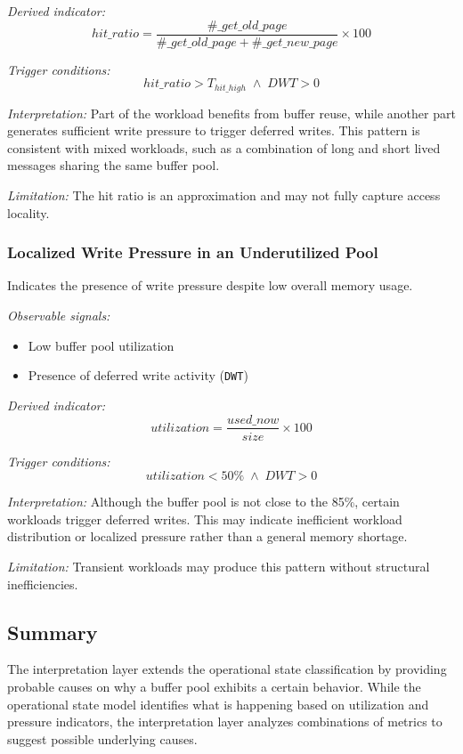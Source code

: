 \textit{Derived indicator:}
\[
hit\_ratio = \frac{\#\_get\_old\_page}{\#\_get\_old\_page + \#\_get\_new\_page} \times 100
\]

\textit{Trigger conditions:}
\[
hit\_ratio > T_{hit\_high} \;\land\; DWT > 0
\]

\textit{Interpretation:}  
Part of the workload benefits from buffer reuse, while another part generates sufficient write pressure to trigger deferred writes. This pattern is consistent with mixed workloads, such as a combination of long and short lived messages sharing the same buffer pool.

\textit{Limitation:}  
The hit ratio is an approximation and may not fully capture access locality.


\subsubsection{Localized Write Pressure in an Underutilized Pool}

Indicates the presence of write pressure despite low overall memory usage.

\textit{Observable signals:}
\begin{itemize}
    \item Low buffer pool utilization
    \item Presence of deferred write activity (\texttt{DWT})
\end{itemize}

\textit{Derived indicator:}
\[
utilization = \frac{used\_now}{size} \times 100
\]

\textit{Trigger conditions:}
\[
utilization < 50\% \;\land\; DWT > 0
\]

\textit{Interpretation:}  
Although the buffer pool is not close to the 85\%, certain workloads trigger deferred writes. This may indicate inefficient workload distribution or localized pressure rather than a general memory shortage.

\textit{Limitation:}  
Transient workloads may produce this pattern without structural inefficiencies.



\subsection{Summary}

The interpretation layer extends the operational state classification by providing probable causes on why a buffer pool exhibits a certain behavior. While the operational state model identifies what is happening based on utilization and pressure indicators, the interpretation layer analyzes combinations of metrics to suggest possible underlying causes.

